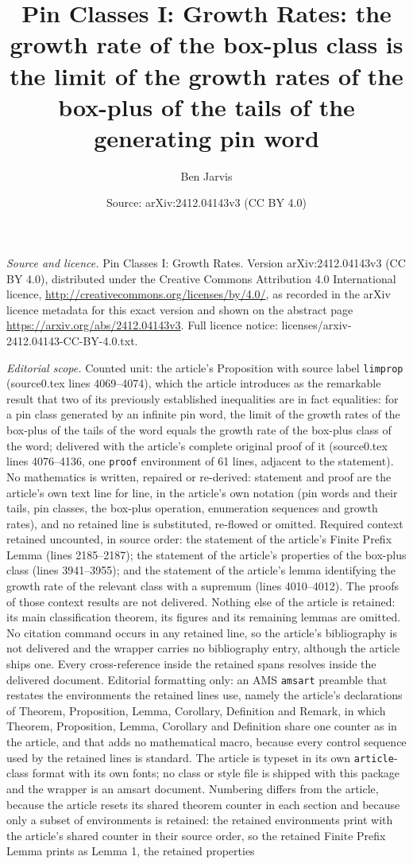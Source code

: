 \documentclass[10pt,a4paper]{amsart}
\title[Pin classes: growth rates]{Pin Classes I: Growth Rates: the growth rate of the box-plus class is the limit of the growth rates of the box-plus of the tails of the generating pin word}
\author{Ben Jarvis}
\date{Source: arXiv:2412.04143v3 (CC BY 4.0)}
\theoremstyle{plain}
\theoremstyle{definition}
\theoremstyle{remark}
\begin{document}
\maketitle
\noindent\emph{Source and licence.} Pin Classes I: Growth Rates. Version arXiv:2412.04143v3 (CC BY 4.0), distributed under the Creative Commons Attribution 4.0 International licence, \url{http://creativecommons.org/licenses/by/4.0/}, as recorded in the arXiv licence metadata for this exact version and shown on the abstract page \url{https://arxiv.org/abs/2412.04143v3}. Full licence notice: licenses/arxiv-2412.04143-CC-BY-4.0.txt.\par\smallskip

\noindent\textit{Editorial scope.} Counted unit: the article's Proposition with source label \texttt{limprop} (source0.tex lines 4069--4074), which the article introduces as the remarkable result that two of its previously established inequalities are in fact equalities: for a pin class generated by an infinite pin word, the limit of the growth rates of the box-plus of the tails of the word equals the growth rate of the box-plus class of the word; delivered with the article's complete original proof of it (source0.tex lines 4076--4136, one \texttt{proof} environment of 61 lines, adjacent to the statement). No mathematics is written, repaired or re-derived: statement and proof are the article's own text line for line, in the article's own notation (pin words and their tails, pin classes, the box-plus operation, enumeration sequences and growth rates), and no retained line is substituted, re-flowed or omitted. Required context retained uncounted, in source order: the statement of the article's Finite Prefix Lemma (lines 2185--2187); the statement of the article's properties of the box-plus class (lines 3941--3955); and the statement of the article's lemma identifying the growth rate of the relevant class with a supremum (lines 4010--4012). The proofs of those context results are not delivered. Nothing else of the article is retained: its main classification theorem, its figures and its remaining lemmas are omitted. No citation command occurs in any retained line, so the article's bibliography is not delivered and the wrapper carries no bibliography entry, although the article ships one. Every cross-reference inside the retained spans resolves inside the delivered document. Editorial formatting only: an AMS \texttt{amsart} preamble that restates the environments the retained lines use, namely the article's declarations of Theorem, Proposition, Lemma, Corollary, Definition and Remark, in which Theorem, Proposition, Lemma, Corollary and Definition share one counter as in the article, and that adds no mathematical macro, because every control sequence used by the retained lines is standard. The article is typeset in its own \texttt{article}-class format with its own fonts; no class or style file is shipped with this package and the wrapper is an amsart document. Numbering differs from the article, because the article resets its shared theorem counter in each section and because only a subset of environments is retained: the retained environments print with the article's shared counter in their source order, so the retained Finite Prefix Lemma prints as Lemma 1, the retained properties 
\end{document}
